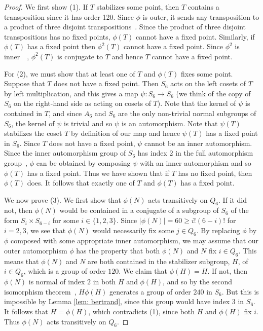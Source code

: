 \documentclass{llncs}
\begin{document}
\begin{proof}
We first show (1).  If $T$ stabilizes some point, then $T$ contains a transposition since it has order 120.  
Since $\phi$ is outer, it sends any transposition to a product of three disjoint transpositions~\cite{MR0096724}. 
Since the product of three disjoint transpositions has no fixed points,  $\phi(T)$ cannot have a fixed point.  
Similarly,  if $\phi(T)$ has a fixed point then $\phi^2(T)$ cannot have a fixed point.  
Since $\phi^2$ is inner~~\cite[p. 133]{Rot65}, $\phi^2(T)$ is conjugate to $T$ and hence $T$ cannot have a fixed point.  

For (2), we must show that at least one of $T$ and $\phi(T)$ fixes some point.  
Suppose that $T$ does not have a fixed point.  
Then $S_6$ acts on the left cosets of $T$ by left multiplication, and this gives a map $\psi\colon S_6\to S_6$ (we think of the copy of $S_6$ on the right-hand side as acting on cosets of $T$).  
Note that the kernel of $\psi$ is contained in $T$, and since $A_6$ and $S_6$ are the only non-trivial normal subgroups of $S_6$, 
 the kernel of $\psi$ is trivial and so $\psi$ is an automorphism.  
 Note that $\psi(T)$ stabilizes the coset $T$ by definition of our map and hence $\psi(T)$ has a fixed point in $S_6$.  
 Since $T$ does not have a fixed point, 
 $\psi$ cannot be an inner automorphism.  
 Since the inner automorphism group of $S_6$ has index $2$ in the full automorphism group~\cite[p. 133]{Rot65}, 
  $\phi$ can be obtained by composing $\psi$ with an inner automorphism and so $\phi(T)$ has a fixed point.  Thus we have shown that if $T$ has no fixed point,  then  $\phi(T)$ does. 
 It follows that exactly one of $T$ and $\phi(T)$ has a fixed point.

 
We now prove (3).  We first show that $\phi(N)$ acts transitively on $Q_6$.  If it did not, then $\phi(N)$ would be contained in a conjugate of a subgroup of $S_6$ of the form $S_i\times S_{6-i}$ for some $i\in \{1,2,3\}$.  Since $|\phi(N)|=60\ge i! (6-i)!$ for $i=2,3$, we see that $\phi(N)$ would necessarily fix some $j\in Q_6$.  By replacing $\phi$ by $\phi$ composed with some appropriate inner automorphism, we may assume that our outer automorphism $\phi$ has the property that both $\phi(N)$ and $N$ fix $i\in Q_6$.  This means that $\phi(N)$ and $N$ are both contained in the stabilizer subgroup, $H$, of $i\in Q_6$, which is a group of order $120$.  We claim that $\phi(H)=H$.  If not, then $\phi(N)$ is normal of index $2$ in both $H$ and $\phi(H)$, and so by the second isomorphism theorem~\cite[p. 26]{Rot65}, $H\phi(H)$ generates a group of order $240$ in $S_6$.  But this is impossible by Lemma \ref{lem: bertrand}, since this group would have index $3$ in $S_6$.  It follows that $H=\phi(H)$, which contradicts (1), since both $H$ and $\phi(H)$ fix $i$.  Thus $\phi(N)$ acts transitively on $Q_6$.  


\end{proof}
\end{document}
